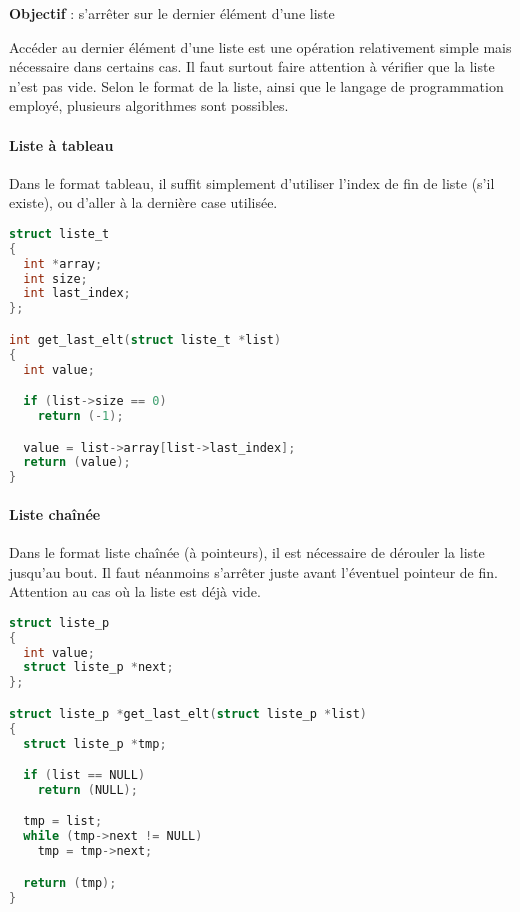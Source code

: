 \documentclass[11pt,a4paper]{article}
\begin{document}
\textbf{Objectif} : s'arrêter sur le dernier élément d'une liste

\bigskip

Accéder au dernier élément d'une liste est une opération relativement simple mais nécessaire dans certains cas.
Il faut surtout faire attention à vérifier que la liste n'est pas vide.
Selon le format de la liste, ainsi que le langage de programmation employé, plusieurs algorithmes sont possibles.

\medskip

\vfillFirst

\paragraph{Liste à tableau}

Dans le format tableau, il suffit simplement d'utiliser l'index de fin de liste (s'il existe), ou d'aller à la dernière case utilisée.

\medskip

\begin{lstlisting}[language=C]
struct liste_t
{
  int *array;
  int size;
  int last_index;
};

int get_last_elt(struct liste_t *list)
{
  int value;

  if (list->size == 0)
    return (-1);

  value = list->array[list->last_index];
  return (value);
} \end{lstlisting}

\vspace*{-0.5cm}


\vfillLast

\clearpage

\vfillFirst

\paragraph{Liste chaînée}

Dans le format liste chaînée (à pointeurs), il est nécessaire de dérouler la liste jusqu'au bout.
Il faut néanmoins s'arrêter juste avant l'éventuel pointeur de fin.
Attention au cas où la liste est déjà vide.

\medskip

\begin{lstlisting}[language=C]
struct liste_p
{
  int value;
  struct liste_p *next;
};

struct liste_p *get_last_elt(struct liste_p *list)
{
  struct liste_p *tmp;

  if (list == NULL)
    return (NULL);

  tmp = list;
  while (tmp->next != NULL)
    tmp = tmp->next;

  return (tmp);
} \end{lstlisting}
\end{document}
